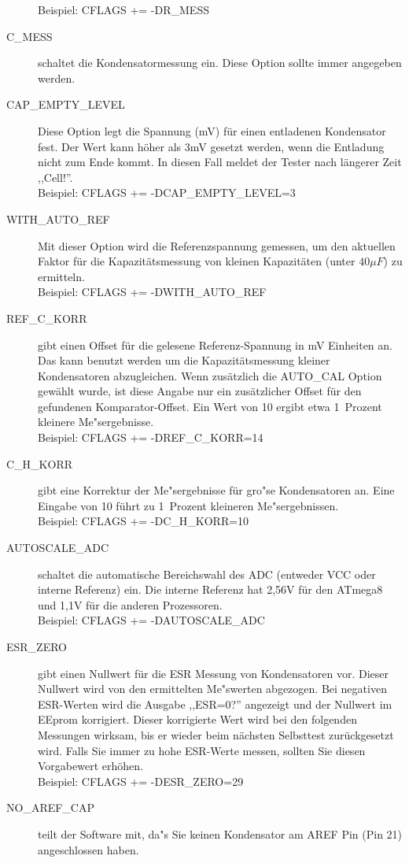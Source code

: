 \begin{description}
Beispiel: CFLAGS += -DR\_MESS
  \item[C\_MESS] schaltet die Kondensatormessung ein.
 Diese Option sollte immer angegeben werden.\\
  \item[CAP\_EMPTY\_LEVEL] Diese Option legt die Spannung (mV) f\"ur einen entladenen Kondensator fest.
Der Wert kann h\"oher als 3mV gesetzt werden, wenn die Entladung nicht zum Ende kommt. In diesen Fall meldet der Tester nach l\"angerer Zeit ,,Cell!''.\\
Beispiel: CFLAGS += -DCAP\_EMPTY\_LEVEL=3
  \item[WITH\_AUTO\_REF] Mit dieser Option wird die Referenzspannung gemessen, um den aktuellen Faktor f\"ur die Kapazit\"atsmessung 
von kleinen Kapazit\"aten (unter \(40\mu F\)) zu ermitteln.\\
Beispiel:  CFLAGS += -DWITH\_AUTO\_REF
  \item[REF\_C\_KORR] gibt einen Offset f\"ur die gelesene Referenz-Spannung in mV Einheiten an.
Das kann benutzt werden um die Kapazit\"atsmessung kleiner Kondensatoren abzugleichen.
Wenn zus\"atzlich die AUTO\_CAL Option gew\"ahlt wurde, ist diese Angabe nur ein zus\"atzlicher Offset f\"ur
den gefundenen Komparator-Offset.
Ein Wert von 10 ergibt etwa 1~Prozent kleinere Me"sergebnisse.\\
Beispiel:  CFLAGS += -DREF\_C\_KORR=14
  \item[C\_H\_KORR] gibt eine Korrektur der Me"sergebnisse f\"ur gro"se Kondensatoren an.
Eine Eingabe von 10 f\"uhrt zu 1~Prozent kleineren Me"sergebnissen.\\
Beispiel:  CFLAGS += -DC\_H\_KORR=10
  \item[AUTOSCALE\_ADC] schaltet die automatische Bereichswahl des ADC (entweder VCC oder interne Referenz) ein.
Die interne Referenz hat 2,56V f\"ur den ATmega8 und 1,1V f\"ur die anderen Prozessoren.\\
Beispiel: CFLAGS += -DAUTOSCALE\_ADC
  \item[ESR\_ZERO] gibt einen Nullwert f\"ur die ESR Messung von Kondensatoren vor. Dieser Nullwert wird von den
ermittelten Me"swerten abgezogen. Bei negativen ESR-Werten wird die Ausgabe ,,ESR=0?'' angezeigt und der Nullwert
im EEprom korrigiert. Dieser korrigierte Wert wird bei den folgenden Messungen wirksam, bis er wieder beim n\"achsten
Selbsttest zur\"uckgesetzt wird.
Falls Sie immer zu hohe ESR-Werte messen, sollten Sie diesen Vorgabewert erh\"ohen.\\
Beispiel: CFLAGS += -DESR\_ZERO=29
  \item[NO\_AREF\_CAP] teilt der Software mit, da"s Sie keinen Kondensator am AREF Pin (Pin 21) angeschlossen haben.

\end{description}
